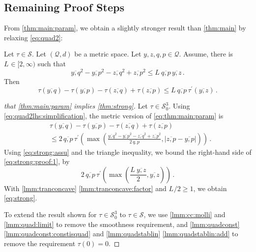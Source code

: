 \documentclass{article}
\newcommand{\lb}{\left(} %
\newcommand{\rb}{\right)} %
\newcommand{\br}[1]{\lb #1 \rb} %
\newcommand{\brOf}[1]{\!\br{#1}} %
\newcommand*{\mc}[1]{\mathcal{#1}}
\newcommand{\pr}{^\prime}
\newcommand{\equationFullstop}{\, .}
\newcommand{\eqfs}{\equationFullstop}
\newcommand{\ol}[2]{\overline{#1,#2}}
\newcommand{\tran}{\tau}
\newcommand{\dtran}{\tran\pr}
\newcommand{\ctransymbol}{L}
\newcommand{\ctrano}[1]{\ctransymbol_{#1}}
\newcommand{\ctransqr}{\ctrano{}}
\newcommand{\setcc}{\mc S}
\newcommand{\setccod}[1]{\mc S_0^{#1}}
\begin{document}
\subsection{Remaining Proof Steps}\label{ssec:remaining}
%
From \cref{thm:main:param}, we obtain a slightly stronger result than \cref{thm:main} by relaxing \eqref{eq:quad2}:
\begin{theorem}\label{thm:strong}
	Let $\tran\in\setcc$.  Let $(\mc Q, d)$ be a metric space.
	Let $y,z,q,p\in\mc Q$. Assume, there is $\ctransqr\in[2,\infty)$ such that
	\begin{equation}\label{eq:strong:assu}
		\ol yq^2 - \ol yp^2 - \ol zq^2 + \ol zp^2 \leq \ctransqr \, \ol qp\, \ol yz
		\eqfs
	\end{equation}
	Then
	\begin{equation}\label{eq:strong}
		\tran(\ol yq)  - \tran(\ol yp) - \tran(\ol zq) + \tran(\ol zp) \leq \ctransqr \, \ol qp \, \dtran\brOf{\ol yz}\eqfs
	\end{equation}
\end{theorem}
\begin{proof}[that \cref{thm:main:param} implies \cref{thm:strong}]\label{proof:paramImpliesStrong}
	Let $\tran \in \setccod3$.
	Using \eqref{eq:quad2lhs:simplification}, the metric version of \eqref{eq:thm:main:param} is 
	\begin{equation}\label{eq:strong:proof:1}
		\begin{aligned}
			&\tran(\ol yq)  - \tran(\ol yp) - \tran(\ol zq) + \tran(\ol zp) 
			\\&\leq 
			2 \,\ol qp\, \dtran\brOf{\max\brOf{\frac{\ol yq^2 - \ol yp^2 - \ol zq^2 + \ol zp^2}{2 \,\ol qp}, |\ol zp - \ol yp|}}
			\eqfs
		\end{aligned}
	\end{equation}
	Using \eqref{eq:strong:assu} and the triangle inequality, we bound the right-hand side of \eqref{eq:strong:proof:1}, by
	\begin{equation}
		2 \,\ol qp\, \dtran\brOf{\max\brOf{\frac{\ctransqr \, \ol yz}{2}, \ol yz}}\eqfs
	\end{equation}
	With \cref{lmm:tranconcave} \ref{lmm:tranconcave:factor} and $\ctransqr/2\geq 1$, we obtain \eqref{eq:strong}.
	
	To extend the result shown for $\tran\in\setccod3$ to $\tran\in\setcc$, we use \cref{lmm:cc:molli} and \cref{lmm:quad:limit} to remove the smoothness requirement, and \cref{lmm:quadconst} \ref{lmm:quadconst:constisquad} and \cref{lmm:quadstablin} \ref{lmm:quadstablin:add} to remove the requirement $\tran(0) = 0$.
\end{proof}
\end{document}

